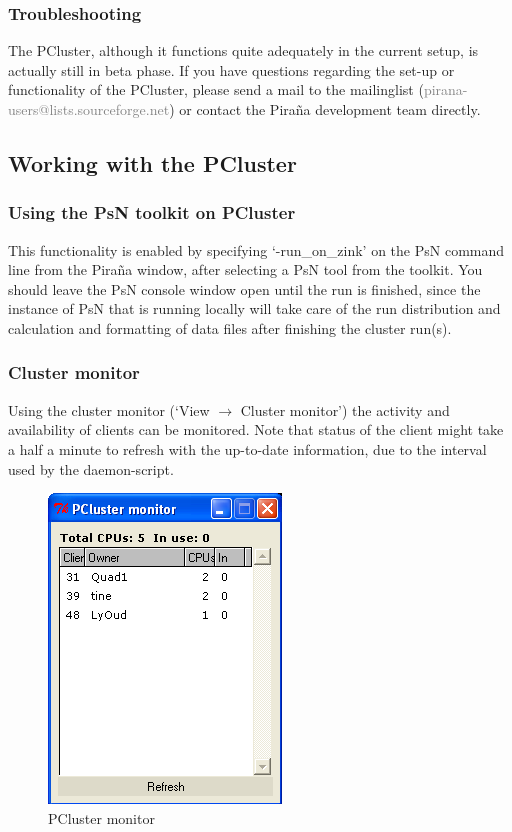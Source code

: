 \documentclass[a4,11pt]{report} \usepackage[pdftex]{graphicx}
\begin{document}
{{{\subsubsection*{Troubleshooting} The PCluster, although it functions
quite adequately in the current setup, is actually still in beta
phase. If you have questions regarding the set-up or functionality of
the PCluster, please send a mail to the mailinglist
(\textcolor{Grey}{pirana-users@lists.sourceforge.net}) or contact the
Pira\~na development team directly.

\pagebreak
\subsection{Working with the PCluster}

\subsubsection*{Using the PsN toolkit on PCluster} This functionality
is enabled by specifying `-run\_on\_zink' on the PsN command line from
the Pira\~na window, after selecting a PsN tool from the toolkit. You
should leave the PsN console window open until the run is finished,
since the instance of PsN that is running locally will take care of
the run distribution and calculation and formatting of data files
after finishing the cluster run(s).

\subsubsection*{Cluster monitor} Using the cluster monitor (`View
$\rightarrow$ Cluster monitor') the activity and availability of
clients can be monitored. Note that status of the client might take a
half a minute to refresh with the up-to-date information, due to the
interval used by the daemon-script.  \vspace{10pt}

\begin{figure}[hbt] \centering
    \includegraphics[scale=0.5]{images/pcluster.png}
    \caption{PCluster monitor}
\end{figure}

}}}
\end{document}
